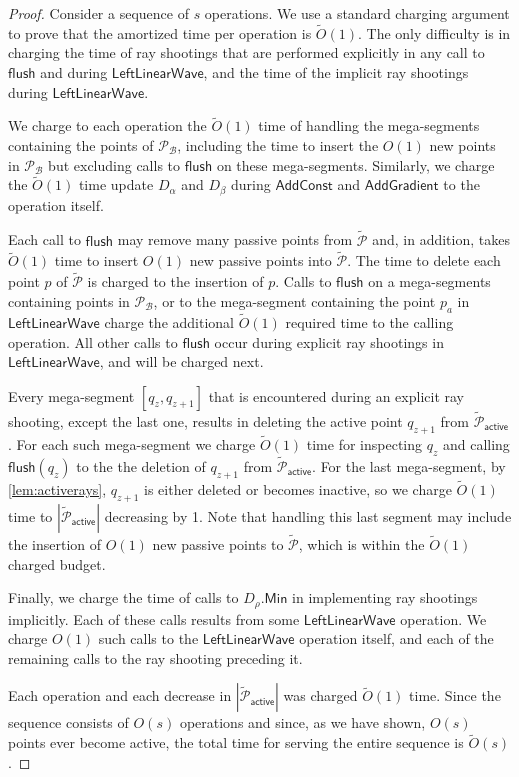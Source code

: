 \documentclass[a4paper,UKenglish,cleveref, autoref, thm-restate]{lipics-v2021}
\newcommand{\AC}{\mathsf{AddConst}}
\newcommand{\AG}{\mathsf{AddGradient}}
\newcommand{\LLW}{\mathsf{LeftLinearWave}}
\newcommand{\local}{\text{short }}
\newcommand{\longrange}{\text{long }}
\newcommand{\Min}{\mathsf{Min}}
\renewcommand{\P}{\mathcal{P}}
\newcommand{\TAP}{\tilde{\P}_{\mathsf{active}}}
\newcommand{\TP}{\tilde{\P}}
\newcommand{\B}{\mathcal{B}}
\newcommand{\flush}{\mathsf{flush}}
\begin{document}
\begin{proof}
Consider a sequence of $s$ operations. We use a standard charging argument to prove that the amortized time per operation is $\tilde O(1)$.  
The only difficulty is in charging the time of ray shootings that are performed explicitly in any call to $\flush$ and during $\LLW$, and the time of the implicit \local ray shootings during $\LLW$. 

We charge to each operation the $\tilde O(1)$ time of handling the mega-segments containing the points of $\P_{\B}$, including the time to insert the $O(1)$ new points in $\P_{\B}$ but excluding calls to $\flush$ on these mega-segments. 
Similarly, we charge the $\tilde O(1)$ time update $D_\alpha$ and $D_\beta$ during $\AC$ and $\AG$ to the operation itself.

Each call to $\flush$ may remove  many passive points from $\TP$ and, in addition, takes $\tilde O(1)$ time to insert $O(1)$ new passive points into $\TP$. 
The time to delete each point $p$ of $\TP$ is charged to the insertion of $p$. Calls to $\flush$ on a mega-segments containing points in $\P_{\B}$, or to the mega-segment containing the point $p_a$ in $\LLW$ charge the additional $\tilde O(1)$ required time to the calling operation. All other calls to $\flush$ occur during explicit \longrange ray shootings in $\LLW$, and will be charged next.

Every mega-segment $[q_z,q_{z+1}]$ that is encountered during an explicit \longrange ray shooting, except the last one, results in deleting the active point $q_{z+1}$ from $\TAP$. 
For each such mega-segment we charge $\tilde O(1)$ time for inspecting $q_z$ and calling $\flush(q_z)$ to the the deletion of $q_{z+1}$ from $\TAP$. 
For the last mega-segment, by \cref{lem:activerays}, $q_{z+1}$ is either deleted or becomes inactive, so we charge $\tilde O(1)$ time to $|\TAP|$ decreasing by 1. Note that handling this last segment may include the insertion of $O(1)$ new passive points to $\TP$, which is within the $\tilde O(1)$ charged budget.

Finally, we charge the time of calls to $D_\rho.\Min$ in implementing \local ray shootings implicitly. Each of these calls results from some $\LLW$ operation. 
We charge $O(1)$ such calls to the $\LLW$ operation itself, and each of the remaining calls to the \longrange ray shooting preceding it.

Each operation and each decrease in $|\TAP|$ was charged $\tilde O(1)$ time. Since the sequence consists of $O(s)$ operations and since, as we have shown, $O(s)$ points ever become active, the total time for serving the entire sequence is $\tilde O(s)$.


\end{proof}
\end{document}
